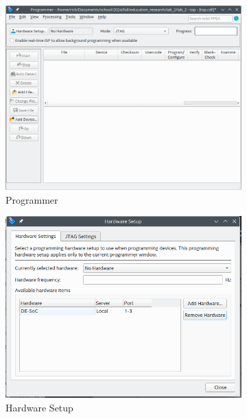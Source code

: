 \documentclass[12pt]{labmanual}
\begin{document}
\begin{figure}[htbp!]
    \centering
    \begin{subfigure}{0.45\textwidth}    
    \includegraphics[width=1\linewidth]{programmer.png}
    \caption{Programmer}
    \label{fig:programmer}
    \end{subfigure}
    \hfill
    \begin{subfigure}{0.45\textwidth}
        \includegraphics[width=1\linewidth]{hardwaresetup.png}
        \caption{Hardware Setup}
        \label{fig:hardwaresetup}
    \end{subfigure}
    \caption{}
\end{figure}
\end{document}
